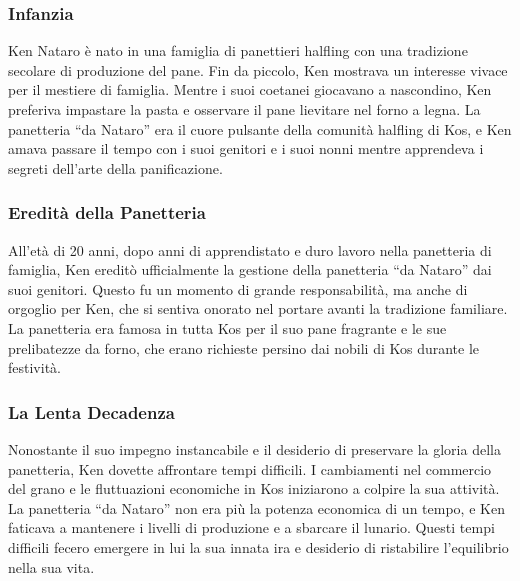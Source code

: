 \subsubsection{Infanzia}\label{infanzia}

Ken Nataro è nato in una famiglia di panettieri halfling con una
tradizione secolare di produzione del pane. Fin da piccolo, Ken mostrava
un interesse vivace per il mestiere di famiglia. Mentre i suoi coetanei
giocavano a nascondino, Ken preferiva impastare la pasta e osservare il
pane lievitare nel forno a legna. La panetteria ``da Nataro'' era il
cuore pulsante della comunità halfling di Kos, e Ken amava passare il
tempo con i suoi genitori e i suoi nonni mentre apprendeva i segreti
dell'arte della panificazione.

\subsubsection{Eredità della Panetteria}
All'età di 20 anni, dopo anni di apprendistato e duro lavoro nella
panetteria di famiglia, Ken ereditò ufficialmente la gestione della
panetteria ``da Nataro'' dai suoi genitori. Questo fu un momento di
grande responsabilità, ma anche di orgoglio per Ken, che si sentiva
onorato nel portare avanti la tradizione familiare. La panetteria era
famosa in tutta Kos per il suo pane fragrante e le sue prelibatezze da
forno, che erano richieste persino dai nobili di Kos durante le
festività.

\subsubsection{La Lenta Decadenza}
Nonostante il suo impegno instancabile e il desiderio di preservare la
gloria della panetteria, Ken dovette affrontare tempi difficili. I
cambiamenti nel commercio del grano e le fluttuazioni economiche in Kos
iniziarono a colpire la sua attività. La panetteria ``da Nataro'' non
era più la potenza economica di un tempo, e Ken faticava a mantenere i
livelli di produzione e a sbarcare il lunario. Questi tempi difficili
fecero emergere in lui la sua innata ira e desiderio di ristabilire
l'equilibrio nella sua vita.

